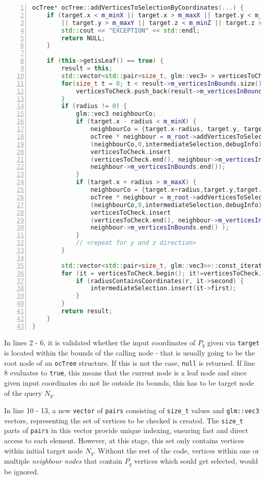 \begin{minipage}{\linewidth}
\begin{lstlisting}[language=C++,numberstyle=\zebra{black!5}{white}{},numbers=left,xleftmargin=2em,tabsize=3]
ocTree* ocTree::addVerticesToSelectionByCoordinates(...) {
	if (target.x < m_minX || target.x > m_maxX || target.y < m_minY
		|| target.y > m_maxY || target.z < m_minZ || target.z > m_maxZ) {
		std::cout << "EXCEPTION" << std::endl;
		return NULL;
	}

	if (this->getisLeaf() == true) {
		result = this;
		std::vector<std::pair<size_t, glm::vec3> > verticesToCheck;
		for(size_t t = 0; t < result->m_verticesInBounds.size();++t){
			verticesToCheck.push_back(result->m_verticesInBounds[t]);
		}
		if (radius != 0) {
			glm::vec3 neighbourCo;
			if (target.x - radius < m_minX) {
				neighbourCo = {target.x-radius, target.y, target.z};
				ocTree * neighbour = m_root->addVerticesToSelectionByCoordinates
				(neighbourCo,0,intermediateSelection,debugInfo);
				verticesToCheck.insert
				(verticesToCheck.end(), neighbour->m_verticesInBounds.begin(),
				neighbour->m_verticesInBounds.end());
			}
			if (target.x + radius > m_maxX) {
				neighbourCo = {target.x+radius,target.y,target.z};
				ocTree * neighbour = m_root->addVerticesToSelectionByCoordinates
				(neighbourCo,0,intermediateSelection,debugInfo);
				verticesToCheck.insert
				(verticesToCheck.end(), neighbour->m_verticesInBounds.begin(),
				neighbour->m_verticesInBounds.end() );
			}
			// <repeat for y and z direction>
		}

		std::vector<std::pair<size_t, glm::vec3>>::const_iterator it;
		for (it = verticesToCheck.begin(); it!=verticesToCheck.end(); ++it) {
			if (radiusContainsCoordinates(r, it->second) {
				intermediateSelection.insert(it->first);
			}
		}
		return result;
	}
}
\end{lstlisting}
\end{minipage}

In lines 2 - 6, it is validated whether the input coordinates of $P_q$ given via \texttt{target} is located within the bounds of the calling node - that is usually going to be the root node of an \texttt{ocTree} structure. If this is not the case, \texttt{null} is returned.
If line 8 evaluates to \texttt{true}, this means that the current node is a leaf node and since given input coordinates do not lie outside its bounds, this has to be target node of the query $N_q$.

In line 10 - 13, a new \texttt{vector} of \texttt{pairs} consisting of \texttt{size\_t} values and \texttt{glm::vec3} vectors, representing the set of vertices to be checked is created. The \texttt{size\_t} parts of  \texttt{pairs} in this vector provide unique indexing, ensuring fast and direct access to each element. However, at this stage, this set only contains vertices within initial target node $N_q$. Without the rest of the code, vertices within one or multiple \textit{neighbour nodes} that contain $P_{q}^{'}$ vertices which sould get selected, would be ignored.

